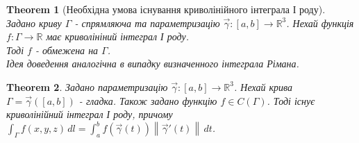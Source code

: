 \documentclass[a4paper, 10pt]{article}
\def\huge{\displaystyle}
\theoremstyle{theoremdd}
\newtheorem{theorem}{Theorem}[subsection]
\theoremstyle{theoremdd}
\theoremstyle{theoremdd}
\theoremstyle{theoremdd}
\theoremstyle{theoremdd}
\theoremstyle{theoremdd}
\theoremstyle{theoremdd}
\theoremstyle{theoremdd}
\newcommand\Norm[1]{\left\lVert#1\right\rVert}
\begin{document}
\begin{theorem}[Необхідна умова існування криволінійного інтеграла І роду]
Задано криву $\Gamma$ - спрямляюча та параметризацію $\vec{\gamma}: [a,b] \to \mathbb{R}^3$. Нехай функція $f: \Gamma \to \mathbb{R}$ має криволініний інтеграл І роду.\\
Тоді $f$ - обмежена на $\Gamma$.\\
\textit{Ідея доведення аналогічна в випадку визначенного інтеграла Рімана.}
\end{theorem}

\begin{theorem}
Задано параметризацію $\vec{\gamma}: [a,b] \to \mathbb{R}^3$. Нехай крива $\Gamma = \vec{\gamma}([a,b])$ - гладка. Також задано функцію $f \in C(\Gamma)$. Тоді існує криволінійний інтеграл І роду, причому\\
$\huge\int_\Gamma f(x,y,z)\,dl = \int_a^b f(\vec{\gamma}(t)) \Norm{\vec{\gamma}'(t)}\,dt$.
\end{theorem}
\end{document}
